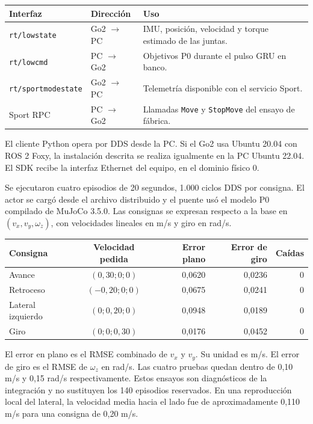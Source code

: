 \documentclass[11pt,a4paper]{article}
\newcommand{\sectionpage}[2]{\vspace*{.3em}{\color{accent}\small\bfseries #1\par}\vspace{.65em}{\LARGE\bfseries\color{ink} #2\par}\vspace{.85em}}
\begin{document}
\begin{tabularx}{\linewidth}{@{}p{.29\linewidth}p{.16\linewidth}L@{}}
\toprule
\textbf{Interfaz} & \textbf{Dirección} & \textbf{Uso} \\
\midrule
\texttt{rt/lowstate} & Go2 $\to$ PC & IMU, posición, velocidad y torque estimado de las juntas. \\
\texttt{rt/lowcmd} & PC $\to$ Go2 & Objetivos P0 durante el pulso GRU en banco. \\
\texttt{rt/sportmodestate} & Go2 $\to$ PC & Telemetría disponible con el servicio Sport. \\
Sport RPC & PC $\to$ Go2 & Llamadas \texttt{Move} y \texttt{StopMove} del ensayo de fábrica. \\
\bottomrule
\end{tabularx}

\vspace{.65em}
El cliente Python opera por DDS desde la PC. Si el Go2 usa Ubuntu 20.04 con ROS 2 Foxy, la instalación descrita se realiza igualmente en la PC Ubuntu 22.04. El SDK recibe la interfaz Ethernet del equipo, en el dominio físico 0.

\newpage
\sectionpage{02 · EVIDENCIA}{Resultados en MuJoCo}

Se ejecutaron cuatro episodios de 20 segundos, 1.000 ciclos DDS por consigna. El actor se cargó desde el archivo distribuido y el puente usó el modelo P0 compilado de MuJoCo 3.5.0. Las consignas se expresan respecto a la base en $(v_x, v_y, \omega_z)$, con velocidades lineales en m/s y giro en rad/s.

\begin{tabularx}{\linewidth}{@{}L c r r r@{}}
\toprule
\textbf{Consigna} & \textbf{Velocidad pedida} & \textbf{Error plano} & \textbf{Error de giro} & \textbf{Caídas} \\
\midrule
Avance & $(0{,}30;0;0)$ & 0,0620 & 0,0236 & 0 \\
Retroceso & $(-0{,}20;0;0)$ & 0,0675 & 0,0241 & 0 \\
Lateral izquierdo & $(0;0{,}20;0)$ & 0,0948 & 0,0189 & 0 \\
Giro & $(0;0;0{,}30)$ & 0,0176 & 0,0452 & 0 \\
\bottomrule
\end{tabularx}

El error en plano es el RMSE combinado de $v_x$ y $v_y$. Su unidad es m/s. El error de giro es el RMSE de $\omega_z$ en rad/s. Las cuatro pruebas quedan dentro de 0,10 m/s y 0,15 rad/s respectivamente. Estos ensayos son diagnósticos de la integración y no sustituyen los 140 episodios reservados. En una reproducción local del lateral, la velocidad media hacia el lado fue de aproximadamente 0,110 m/s para una consigna de 0,20 m/s.
\end{document}

